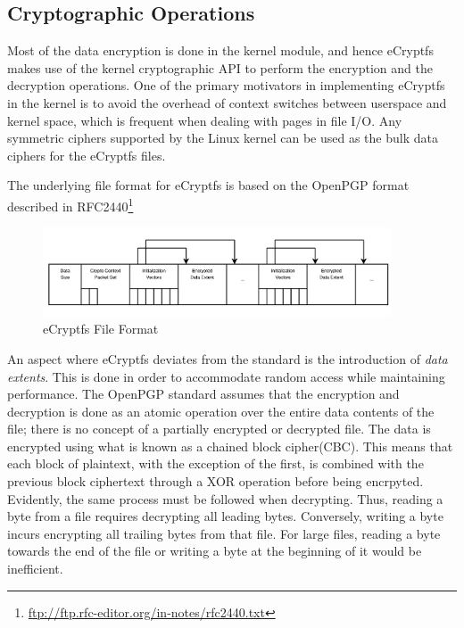 \subsection{Cryptographic Operations}
\label{sub-sec:crypt-ops-ecryptfs}

Most of the data encryption is done in the kernel module, and hence eCryptfs makes use of the kernel cryptographic API to perform the encryption and the decryption operations. One of the primary motivators in implementing eCryptfs in the kernel is to avoid the overhead of context switches between userspace and kernel space, which is frequent when dealing with pages in file I/O. Any symmetric ciphers supported by the Linux kernel can be used as the bulk data ciphers for the eCryptfs files.

The underlying file format for eCryptfs is based on the OpenPGP format described in RFC2440\footnote{\url{ftp://ftp.rfc-editor.org/in-notes/rfc2440.txt}}

\begin{figure}[h!]
\centering
    \includegraphics[width=0.92\textwidth]{src/img/ecryptfs/fileformat.png}
\caption{eCryptfs File Format}
\end{figure}

An aspect where eCryptfs deviates from the standard is the introduction of \textit{data extents}. This is done in order to accommodate random access while maintaining performance. The OpenPGP standard assumes that the encryption and decryption is done as an atomic operation over the entire data contents of the file; there is no concept of a partially encrypted or decrypted file. The data is encrypted using what is known as a chained block cipher(CBC). This means that each block of plaintext, with the exception of the first, is combined with the previous block ciphertext through a XOR operation before being encrpyted. Evidently, the same process must be followed when decrypting. Thus, reading a byte from a file requires decrypting all leading bytes. Conversely, writing a byte incurs encrypting all trailing bytes from that file. For large files, reading a byte towards the end of the file or writing a byte at the beginning of it would be inefficient.

